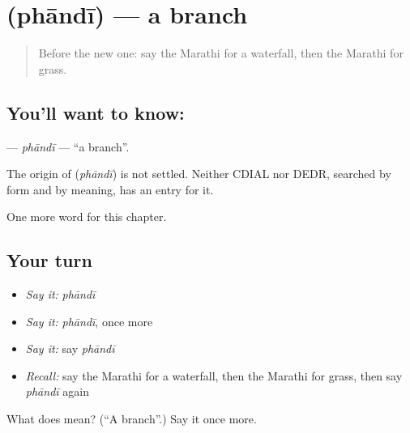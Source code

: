 \section[\texorpdfstring{\mr{फांदी} (phāndī)}{फांदी (phāndī)}]{ (phāndī) — a branch}

\label{lesson:MR-C139-phandi}



\begin{quote}
Before the new one: say the Marathi for a waterfall, then the Marathi for grass.
\end{quote}

\subsection*{You'll want to know: }
\textbf{} — \emph{phāndī} — \textquotedblleft{}a branch\textquotedblright{}.

\begin{cousinweb}
The origin of \textbf{} (\emph{phāndī}) is not settled. Neither CDIAL nor DEDR, searched by form and by meaning, has an entry for it.
\end{cousinweb}

\begin{grammarlens}[title={What you've built}]
One more word for this chapter.
\end{grammarlens}

\subsection*{Your turn}
\begin{itemize}
\raggedright
  \item \emph{Say it:} \emph{phāndī}
  \item \emph{Say it:} \emph{phāndī}, once more
  \item \emph{Say it:} say \emph{phāndī}
  \item \emph{Recall:} say the Marathi for a waterfall, then the Marathi for grass, then say \emph{phāndī} again
\end{itemize}

\begin{tcolorbox}[breakable,colback=teal!4,colframe=teal!35!black,title={Before you move on}]
What does  mean? (\textquotedblleft{}A branch\textquotedblright{}.) Say it once more.
\end{tcolorbox}
